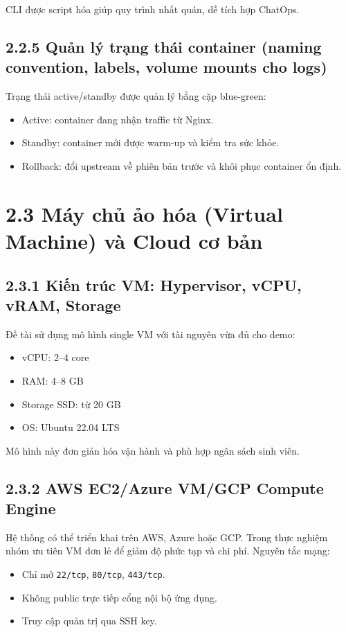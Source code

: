 CLI được script hóa giúp quy trình nhất quán, dễ tích hợp ChatOps.

\subsection*{2.2.5 Quản lý trạng thái container (naming convention, labels, volume mounts cho logs)}
Trạng thái active/standby được quản lý bằng cặp blue-green:
\begin{itemize}
  \item Active: container đang nhận traffic từ Nginx.
  \item Standby: container mới được warm-up và kiểm tra sức khỏe.
  \item Rollback: đổi upstream về phiên bản trước và khôi phục container ổn định.
\end{itemize}

\section*{2.3 Máy chủ ảo hóa (Virtual Machine) và Cloud cơ bản}

\subsection*{2.3.1 Kiến trúc VM: Hypervisor, vCPU, vRAM, Storage}
Đề tài sử dụng mô hình single VM với tài nguyên vừa đủ cho demo:
\begin{itemize}
  \item vCPU: 2--4 core
  \item RAM: 4--8 GB
  \item Storage SSD: từ 20 GB
  \item OS: Ubuntu 22.04 LTS
\end{itemize}

Mô hình này đơn giản hóa vận hành và phù hợp ngân sách sinh viên.

\subsection*{2.3.2 AWS EC2/Azure VM/GCP Compute Engine}
Hệ thống có thể triển khai trên AWS, Azure hoặc GCP. Trong thực nghiệm nhóm ưu tiên VM đơn lẻ để giảm độ phức tạp và chi phí. Nguyên tắc mạng:
\begin{itemize}
  \item Chỉ mở \texttt{22/tcp}, \texttt{80/tcp}, \texttt{443/tcp}.
  \item Không public trực tiếp cổng nội bộ ứng dụng.
  \item Truy cập quản trị qua SSH key.
\end{itemize}

